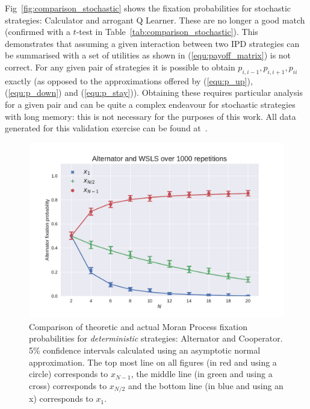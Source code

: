 \documentclass[10pt,letterpaper]{article}
\begin{document}
Fig~\ref{fig:comparison_stochastic} shows the fixation probabilities for
stochastic strategies: Calculator and arrogant Q Learner. These are no longer a
good match (confirmed with a \(t\)-test in
Table~\ref{tab:comparison_stochastic}). This demonstrates that assuming
a given interaction between two IPD strategies can be summarised with a set of
utilities as shown in (\ref{equ:payoff_matrix}) is not correct. For any given pair of
strategies it is possible to obtain \(p_{i,i-1}, p_{i,i+1}, p_{ii}\) exactly (as
opposed to the approximations offered by (\ref{equ:p_up}), (\ref{equ:p_down})
and (\ref{equ:p_stay})). Obtaining these requires particular analysis for a
given pair and can be quite a complex endeavour for stochastic strategies with
long memory: this is not necessary for the purposes of this work.  All data
generated for this validation exercise can be found at~\cite{data}.

\begin{figure}[!hbtp]
    \centering
    \includegraphics[width=.95\columnwidth]{./Alternator_v_WSLS.pdf}
    \caption{Comparison of theoretic and actual Moran Process fixation
             probabilities for \textit{deterministic} strategies: Alternator and
         Cooperator. 5\% confidence intervals calculated using an asymptotic
     normal approximation.
The top most line on all figures (in red and using a circle) corresponds to
\(x_{N-1}\), the middle line (in green and using a cross) corresponds to
\(x_{N/2}\) and the bottom line (in blue and using an x) corresponds to
\(x_{1}\).}
    \label{fig:comparison_deterministic}
\end{figure}
\end{document}
